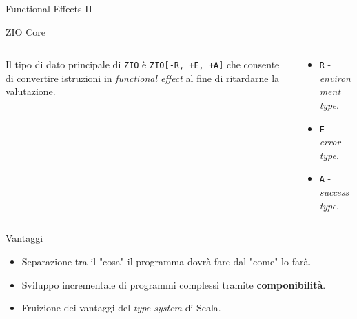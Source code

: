 \begin{frame}{Functional Effects II}
  \begin{block}{ZIO Core}
    \vspace{4mm}
    \begin{columns}
      \begin{column}{.5\textwidth}
        Il tipo di dato principale di \texttt{ZIO} è \texttt{ZIO[-R, +E, +A]} che consente di convertire istruzioni in \textit{functional effect} al fine di ritardarne la valutazione.
      \end{column}
      \begin{column}{.4\textwidth}
        \begin{itemize}
          \item \texttt{R} - \textit{environment type}.
          \item \texttt{E} - \textit{error type}.
          \item \texttt{A} - \textit{success type}.
        \end{itemize}
      \end{column}
    \end{columns}
    \vspace{2mm}
  \end{block}

  \begin{exampleblock}{Vantaggi}
    \begin{itemize}
      \item Separazione tra il "cosa" il programma dovrà fare dal "come" lo farà.
      \item Sviluppo incrementale di programmi complessi tramite \textbf{componibilità}.
      \item Fruizione dei vantaggi del \textit{type system} di Scala. 
    \end{itemize}
  \end{exampleblock}
\end{frame}

